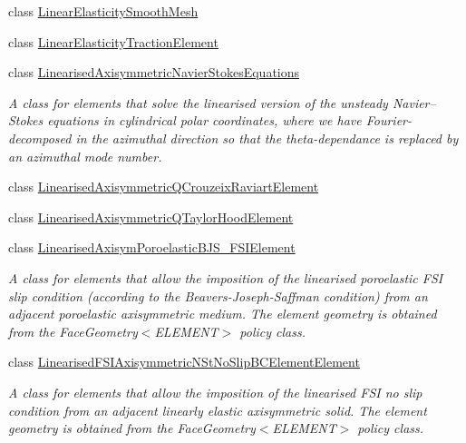 \begin{DoxyCompactItemize}
\item 
class \hyperlink{classoomph_1_1LinearElasticitySmoothMesh}{Linear\+Elasticity\+Smooth\+Mesh}
\item 
class \hyperlink{classoomph_1_1LinearElasticityTractionElement}{Linear\+Elasticity\+Traction\+Element}
\item 
class \hyperlink{classoomph_1_1LinearisedAxisymmetricNavierStokesEquations}{Linearised\+Axisymmetric\+Navier\+Stokes\+Equations}
\begin{DoxyCompactList}\small\item\em A class for elements that solve the linearised version of the unsteady Navier--Stokes equations in cylindrical polar coordinates, where we have Fourier-\/decomposed in the azimuthal direction so that the theta-\/dependance is replaced by an azimuthal mode number. \end{DoxyCompactList}\item 
class \hyperlink{classoomph_1_1LinearisedAxisymmetricQCrouzeixRaviartElement}{Linearised\+Axisymmetric\+Q\+Crouzeix\+Raviart\+Element}
\item 
class \hyperlink{classoomph_1_1LinearisedAxisymmetricQTaylorHoodElement}{Linearised\+Axisymmetric\+Q\+Taylor\+Hood\+Element}
\item 
class \hyperlink{classoomph_1_1LinearisedAxisymPoroelasticBJS__FSIElement}{Linearised\+Axisym\+Poroelastic\+B\+J\+S\+\_\+\+F\+S\+I\+Element}
\begin{DoxyCompactList}\small\item\em A class for elements that allow the imposition of the linearised poroelastic F\+SI slip condition (according to the Beavers-\/\+Joseph-\/\+Saffman condition) from an adjacent poroelastic axisymmetric medium. The element geometry is obtained from the Face\+Geometry$<$\+E\+L\+E\+M\+E\+N\+T$>$ policy class. \end{DoxyCompactList}\item 
class \hyperlink{classoomph_1_1LinearisedFSIAxisymmetricNStNoSlipBCElementElement}{Linearised\+F\+S\+I\+Axisymmetric\+N\+St\+No\+Slip\+B\+C\+Element\+Element}
\begin{DoxyCompactList}\small\item\em A class for elements that allow the imposition of the linearised F\+SI no slip condition from an adjacent linearly elastic axisymmetric solid. The element geometry is obtained from the Face\+Geometry$<$\+E\+L\+E\+M\+E\+N\+T$>$ policy class. \end{DoxyCompactList}\item 

\end{DoxyCompactItemize}
